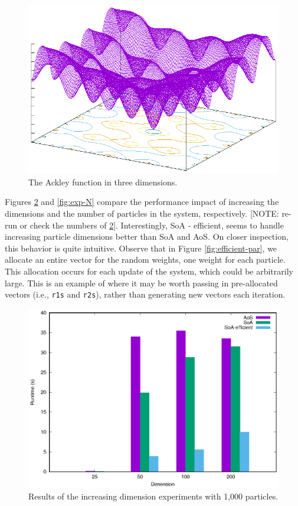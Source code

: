 \begin{figure}
  \includegraphics[width=\columnwidth]{../img/output/ackley}
  \caption{The Ackley function in three dimensions.}\label{fig:ackley}
\end{figure}

Figures \ref{fig:exp-dim} and \ref{fig:exp-N} compare the performance impact of
increasing the dimensions and the number of particles in the system,
respectively. [NOTE: re-run or check the numbers of
\ref{fig:exp-dim}]. Interestingly, SoA - efficient, seems to handle increasing
particle dimensions better than SoA and AoS. On closer inspection, this behavior
is quite intuitive. Observe that in Figure \ref{fig:efficient-par}, we allocate
an entire vector for the random weights, one weight for each particle. This
allocation occurs for each update of the system, which could be arbitrarily
large. This is an example of where it may be worth passing in pre-allocated
vectors (i.e., \texttt{r1s} and \texttt{r2s}), rather than generating new
vectors each iteration.


\begin{figure}
  \includegraphics[width=\columnwidth]{../img/output/dim}
  \caption{Results of the increasing dimension experiments with 1,000
    particles.}
  \label{fig:exp-dim}
\end{figure}

